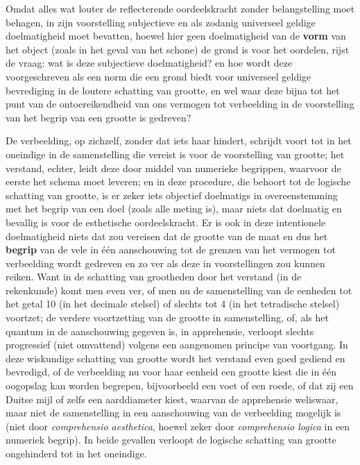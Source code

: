 \bigskip
Omdat alles wat louter de reflecterende oordeelskracht zonder belangstelling moet behagen, in zijn voorstelling subjectieve en als zodanig universeel geldige doelmatigheid moet bevatten, hoewel hier geen doelmatigheid van de \textbf{vorm} van het object (zoals in het geval van het schone) de grond is voor het oordelen, rijst de vraag: wat is deze subjectieve doelmatigheid? en hoe wordt deze voorgeschreven als een norm die een grond biedt voor universeel geldige bevrediging in de loutere schatting van grootte, en wel waar deze bijna tot het punt van de ontoereikendheid van ons vermogen tot verbeelding in de voorstelling van het begrip van een grootte is gedreven?

De verbeelding, op zichzelf, zonder dat iets haar hindert, schrijdt voort tot in het oneindige in de samenstelling die vereist is voor de voorstelling van grootte; het verstand, echter, leidt deze door middel van numerieke begrippen, waarvoor de eerste het schema moet leveren; en in deze procedure, die behoort tot de logische schatting van grootte, is er zeker iets objectief doelmatigs in overeenstemming met het begrip van een doel (zoals alle meting is), maar niets dat doelmatig en bevallig is voor de esthetische oordeelskracht. Er is ook in deze intentionele doelmatigheid niets dat zou vereisen dat de grootte van de maat en dus het \textbf{begrip} van de vele in één aanschouwing tot de grenzen van het vermogen tot verbeelding wordt gedreven en zo ver als deze in voorstellingen zou kunnen reiken. Want in de schatting van grootheden door het verstand (in de rekenkunde) komt men even ver, of men nu de samenstelling van de eenheden tot het getal 10 (in het decimale stelsel) of slechts tot 4 (in het tetradische stelsel) voortzet; de verdere voortzetting van de grootte in samenstelling, of, als het quantum in de aanschouwing gegeven is, in apprehensie, verloopt slechts progressief (niet omvattend) volgens een aangenomen principe van voortgang. In deze wiskundige schatting van grootte wordt het verstand even goed gediend en bevredigd, of de verbeelding nu voor haar eenheid een grootte kiest die in één oogopslag kan worden begrepen, bijvoorbeeld een voet of een roede, of dat zij een Duitse mijl of zelfs een aarddiameter kiest, waarvan de apprehensie weliswaar, maar niet de samenstelling in een aanschouwing van de verbeelding mogelijk is (niet door \textit{comprehensio aesthetica}, hoewel zeker door \textit{comprehensio logica} in een numeriek begrip). In beide gevallen verloopt de logische schatting van grootte ongehinderd tot in het oneindige.

